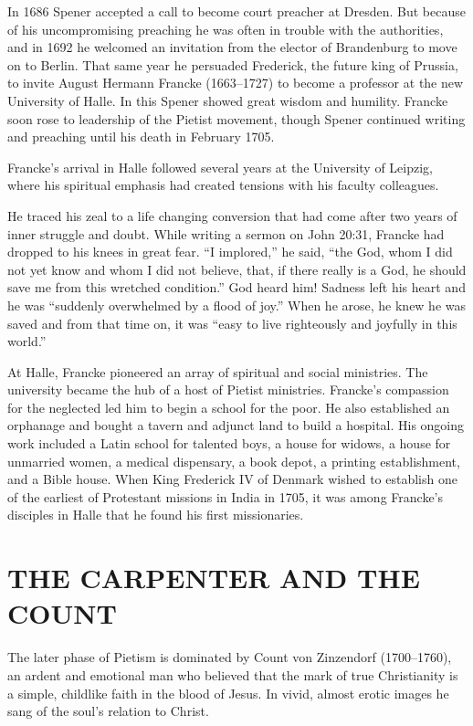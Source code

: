 In 1686 Spener accepted a call to become court preacher at Dresden. But because of his
uncompromising preaching he was often in trouble with the authorities, and in 1692 he welcomed an
invitation from the elector of Brandenburg to move on to Berlin. That same year he persuaded
Frederick, the future king of Prussia, to invite August Hermann Francke (1663–1727) to become a
professor at the new University of Halle. In this Spener showed great wisdom and humility. Francke
soon rose to leadership of the Pietist movement, though Spener continued writing and preaching until
his death in February 1705.

Francke’s arrival in Halle followed several years at the University of Leipzig, where his spiritual
emphasis had created tensions with his faculty colleagues.

\begin{blockquote}
He traced his zeal to a life changing conversion that had come after two years of inner struggle and
doubt. While writing a sermon on John 20:31, Francke had dropped to his knees in great fear. “I
implored,” he said, “the God, whom I did not yet know and whom I did not believe, that, if there
really is a God, he should save me from this wretched condition.” God heard him! Sadness left his
heart and he was “suddenly overwhelmed by a flood of joy.” When he arose, he knew he was saved and
from that time on, it was “easy to live righteously and joyfully in this world.”
\end{blockquote}

At Halle, Francke pioneered an array of spiritual and social ministries. The university became the
hub of a host of Pietist ministries. Francke’s compassion for the neglected led him to begin a
school for the poor. He also established an orphanage and bought a tavern and adjunct land to build
a hospital. His ongoing work included a Latin school for talented boys, a house for widows, a house
for unmarried women, a medical dispensary, a book depot, a printing establishment, and a Bible
house. When King Frederick IV of Denmark wished to establish one of the earliest of Protestant
missions in India in 1705, it was among Francke’s disciples in Halle that he found his first
missionaries.

\section{THE CARPENTER AND THE COUNT}

The later phase of Pietism is dominated by Count von Zinzendorf (1700–1760), an ardent and emotional
man who believed that the mark of true Christianity is a simple, childlike faith in the blood of
Jesus. In vivid, almost erotic images he sang of the soul’s relation to Christ.

